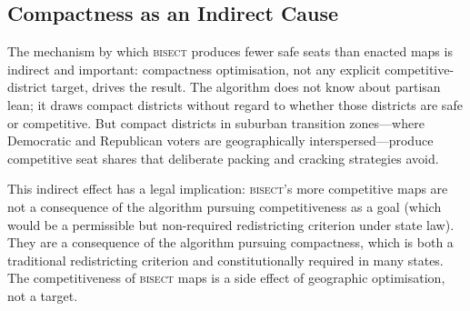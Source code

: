 \subsection{Compactness as an Indirect Cause}

The mechanism by which \textsc{bisect} produces fewer safe seats than enacted maps is
indirect and important: compactness optimisation, not any explicit competitive-district
target, drives the result. The algorithm does not know about partisan lean; it draws
compact districts without regard to whether those districts are safe or competitive.
But compact districts in suburban transition zones---where Democratic and Republican
voters are geographically interspersed---produce competitive seat shares that deliberate
packing and cracking strategies avoid.

This indirect effect has a legal implication: \textsc{bisect}'s more competitive maps
are not a consequence of the algorithm pursuing competitiveness as a goal (which would
be a permissible but non-required redistricting criterion under state law). They are
a consequence of the algorithm pursuing compactness, which is both a traditional
redistricting criterion and constitutionally required in many states. The competitiveness
of \textsc{bisect} maps is a side effect of geographic optimisation, not a target.

